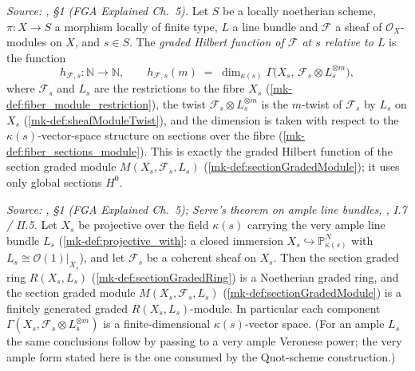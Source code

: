 \begin{definition}\label{mk-def:fiber_hilbert_function}
  \leanok

  \textit{Source: \cite{nitsure-hilbert-quot}, \S 1 (FGA Explained Ch.~5).}
  Let \(S\) be a locally noetherian scheme, \(\pi : X \to S\) a morphism
  locally of finite type, \(L\) a line bundle and \(\mathcal{F}\) a sheaf of
  \(\mathcal{O}_X\)-modules on \(X\), and \(s \in S\). The \emph{graded
  Hilbert function of \(\mathcal{F}\) at \(s\) relative to \(L\)} is the
  function
  \[
    h_{\mathcal{F},s} : \mathbb{N} \longrightarrow \mathbb{N}, \qquad
    h_{\mathcal{F},s}(m) \;=\;
    \dim_{\kappa(s)} \Gamma\bigl(X_s,\, \mathcal{F}_s \otimes L_s^{\otimes m}\bigr),
  \]
  where \(\mathcal{F}_s\) and \(L_s\) are the restrictions to the fibre
  \(X_s\) (\ref{mk-def:fiber_module_restriction}), the twist
  \(\mathcal{F}_s \otimes L_s^{\otimes m}\) is the \(m\)-twist of
  \(\mathcal{F}_s\) by \(L_s\) on \(X_s\) (\ref{mk-def:sheafModuleTwist}), and
  the dimension is taken with respect to the \(\kappa(s)\)-vector-space
  structure on sections over the fibre (\ref{mk-def:fiber_sections_module}).
  This is exactly the graded Hilbert function of the section graded module
  \(M(X_s, \mathcal{F}_s, L_s)\) (\ref{mk-def:sectionGradedModule}); it uses
  only global sections \(H^0\).
\end{definition}

\begin{lemma}
  \label{mk-lem:sectionGradedModule_fg}
  \leanok
  \textit{Source: \cite{nitsure-hilbert-quot}, \S 1 (FGA Explained Ch.~5); Serre's theorem on
  ample line bundles, \cite{hartshorne-ag}, I.7 / II.5.}
  Let \(X_s\) be projective over the field \(\kappa(s)\) carrying the very
  ample line bundle \(L_s\) (\ref{mk-def:projective_with}: a closed immersion
  \(X_s \hookrightarrow \mathbb{P}^N_{\kappa(s)}\) with
  \(L_s \cong \mathcal{O}(1)|_{X_s}\)), and let \(\mathcal{F}_s\) be a
  coherent sheaf on \(X_s\).
  Then the section graded ring \(R(X_s, L_s)\) (\ref{mk-def:sectionGradedRing}) is a
  Noetherian graded ring, and the section graded module
  \(M(X_s, \mathcal{F}_s, L_s)\) (\ref{mk-def:sectionGradedModule}) is a finitely
  generated graded \(R(X_s, L_s)\)-module. In particular each component
  \(\Gamma(X_s, \mathcal{F}_s \otimes L_s^{\otimes m})\) is a finite-dimensional
  \(\kappa(s)\)-vector space.
  (For an ample \(L_s\) the same conclusions follow by passing to a very
  ample Veronese power; the very ample form stated here is the one consumed
  by the Quot-scheme construction.)
\end{lemma}

